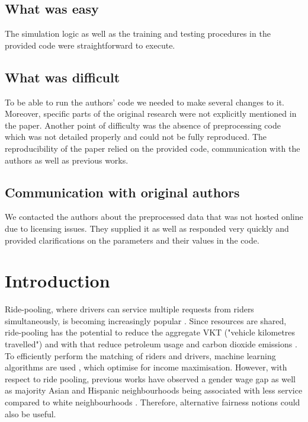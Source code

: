 \subsection*{What was easy}

The simulation logic as well as the training and testing procedures in the provided code were straightforward to execute. 



\subsection*{What was difficult}



To be able to run the authors' code we needed to make several changes to it. Moreover, specific parts of the original research were not explicitly mentioned in the paper. Another point of difficulty was the absence of preprocessing code which was not detailed properly and could not be fully reproduced. The reproducibility of the paper relied on the provided code, communication with the authors as well as previous works.



\subsection*{Communication with original authors}

We contacted the authors about the preprocessed data that was not hosted online due to licensing issues. They supplied it as well as responded very quickly and provided clarifications on the parameters and their values in the code.


\section{Introduction}
Ride-pooling, where drivers can service multiple requests from riders simultaneously, is becoming increasingly popular \cite{sharing_attention}. Since resources are shared, ride-pooling has the potential to reduce the aggregate VKT ("vehicle kilometres travelled") and with that reduce petroleum usage and carbon dioxide emissions \cite{zhu22}. To efficiently perform the matching of riders and drivers, machine learning algorithms are used \cite{turakhia17}, which optimise for income maximisation. However, with respect to ride pooling, previous works have observed a gender wage gap \cite{cook18} as well as majority Asian and Hispanic neighbourhoods being associated with less service compared to white neighbourhoods \cite{brown18}. Therefore, alternative fairness notions could also be useful.

